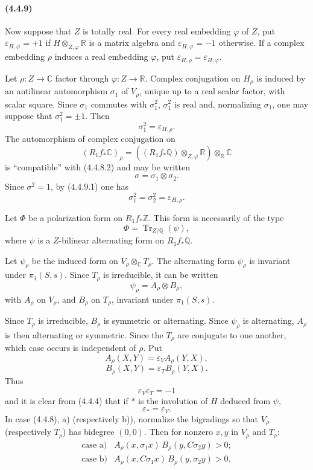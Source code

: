 \documentclass[10pt]{article}
\newcommand{\C}{\mathbb C}
\newcommand{\Q}{\mathbb Q}
\newcommand{\Z}{\mathbb Z}
\newcommand{\R}{\mathbb R}
\newcommand{\Tr}{\operatorname{Tr}}
\begin{document}

\paragraph{(4.4.9)} Now suppose that $Z$ is totally real. For every real embedding $\varphi$ of $Z$, put $\varepsilon_{H,\varphi}=+1$ if $H\otimes_{Z,\varphi}\R$ is a matrix algebra and $\varepsilon_{H,\varphi}=-1$ otherwise. If a complex embedding $\rho$ induces a real embedding $\varphi$, put $\varepsilon_{H,\rho}=\varepsilon_{H,\varphi}$.

Let $\rho:Z\to\C$ factor through $\varphi:Z\to\R$. Complex conjugation on $H_\rho$ is induced by an antilinear automorphism $\sigma_1$ of $V_\rho$, unique up to a real scalar factor, with scalar square. Since $\sigma_1$ commutes with $\sigma_1^2$, $\sigma_1^2$ is real and, normalizing $\sigma_1$, one may suppose that $\sigma_1^2=\pm1$. Then
\[
\tag{4.4.9.1}
\sigma_1^2=\varepsilon_{H,\rho}.
\]
The automorphism of complex conjugation on
\[
(R_1f_*\C)_\rho=((R_1f_*\Q)\otimes_{Z,\varphi}\R)\otimes_\R\C
\]
is ``compatible'' with (4.4.8.2) and may be written
\[
\sigma=\sigma_1\otimes\sigma_2.
\]
Since $\sigma^2=1$, by (4.4.9.1) one has
\[
\tag{4.4.9.2}
\sigma_1^2=\sigma_2^2=\varepsilon_{H,\rho}.
\]

Let $\Phi$ be a polarization form on $R_1f_*\Z$. This form is necessarily of the type
\[
\Phi=\Tr_{Z/\Q}(\psi),
\]
where $\psi$ is a $Z$-bilinear alternating form on $R_1f_*\Q$.

Let $\psi_\rho$ be the induced form on $V_\rho\otimes_\C T_\rho$. The alternating form $\psi_\rho$ is invariant under $\pi_1(S,s)$. Since $T_\rho$ is irreducible, it can be written
\[
\tag{4.4.9.3}
\psi_\rho=A_\rho\otimes B_\rho,
\]
with $A_\rho$ on $V_\rho$, and $B_\rho$ on $T_\rho$, invariant under $\pi_1(S,s)$.

Since $T_\rho$ is irreducible, $B_\rho$ is symmetric or alternating. Since $\psi_\rho$ is alternating, $A_\rho$ is then alternating or symmetric. Since the $T_\rho$ are conjugate to one another, which case occurs is independent of $\rho$. Put
\[
\tag{4.4.9.4}
A_\rho(X,Y)=\varepsilon_V A_\rho(Y,X),
\]
\[
\tag{4.4.9.5}
B_\rho(X,Y)=\varepsilon_T B_\rho(Y,X).
\]
Thus
\[
\tag{4.4.9.6}
\varepsilon_V\varepsilon_T=-1
\]
and it is clear from (4.4.4) that if $*$ is the involution of $H$ deduced from $\psi$,
\[
\tag{4.4.9.7}
\varepsilon_*=\varepsilon_V.
\]
In case (4.4.8), a) (respectively b)), normalize the bigradings so that $V_\rho$ (respectively $T_\rho$) has bidegree $(0,0)$. Then for nonzero $x,y$ in $V_\rho$ and $T_\rho$:
\[
\begin{array}{ll}
\text{case a)}& A_\rho(x,\sigma_1x)\,B_\rho(y,C\sigma_2y)>0;\\[0.3em]
\text{case b)}& A_\rho(x,C\sigma_1x)\,B_\rho(y,\sigma_2y)>0.
\end{array}
\]
\end{document}
